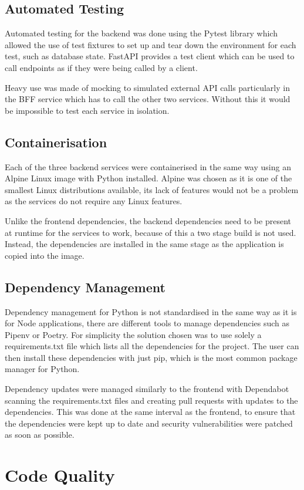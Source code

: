 \subsection{Automated Testing}
Automated testing for the backend was done using the Pytest library which allowed the use of test fixtures to set up and tear down the environment for each test, such as database state. FastAPI provides a test client which can be used to call endpoints as if they were being called by a client.

Heavy use was made of mocking to simulated external API calls particularly in the BFF service which has to call the other two services. Without this it would be impossible to test each service in isolation.

\subsection{Containerisation}
Each of the three backend services were containerised in the same way using an Alpine Linux image with Python installed. Alpine was chosen as it is one of the smallest Linux distributions available, its lack of features would not be a problem as the services do not require any Linux features.

Unlike the frontend dependencies, the backend dependencies need to be present at runtime for the services to work, because of this a two stage build is not used. Instead, the dependencies are installed in the same stage as the application is copied into the image.

\subsection{Dependency Management}
Dependency management for Python is not standardised in the same way as it is for Node applications, there are different tools to manage dependencies such as Pipenv or Poetry. For simplicity the solution chosen was to use solely a requirements.txt file which lists all the dependencies for the project. The user can then install these dependencies with just pip, which is the most common package manager for Python.

Dependency updates were managed similarly to the frontend with Dependabot scanning the requirements.txt files and creating pull requests with updates to the dependencies. This was done at the same interval as the frontend, to ensure that the dependencies were kept up to date and security vulnerabilities were patched as soon as possible.

\section{Code Quality}~\label{sec:code-quality}
